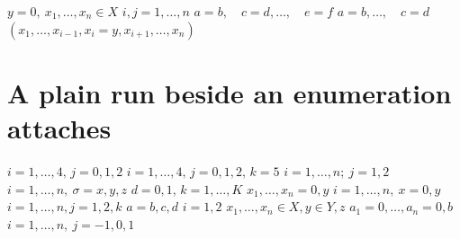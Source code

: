 \documentclass{article}
\begin{document}
$y=0,\ x_1,\ldots,x_n\in X$ $i,j=1,\ldots,n$ $a=b,\quad c=d,\dots,\quad e=f$ $a=b,\dots,\quad c=d$
$(x_1,\ldots,x_{i-1},x_i=y,x_{i+1},\ldots,x_n)$


\section{A plain run beside an enumeration attaches}
$i=1,\ldots,4,\,j=0,1,2$ $i=1,\ldots,4,\,j=0,1,2,\,k=5$ $i=1,\ldots,n;\ j=1,2$ $i=1,\ldots,n,\ \sigma=x,y,z$
$d=0,1,\,k=1,\ldots,K$ $x_1,\dots,x_n=0, y$ $i=1,\ldots,n,\ x=0, y$ $i=1,\ldots,n, j=1,2, k$ $a=b,c,d$ $i=1,2$
$x_1,\ldots,x_n\in X, y\in Y, z$ $a_1=0,\ldots,a_n=0, b$ $i=1,\ldots,n,\ j=-1,0,1$
\end{document}
